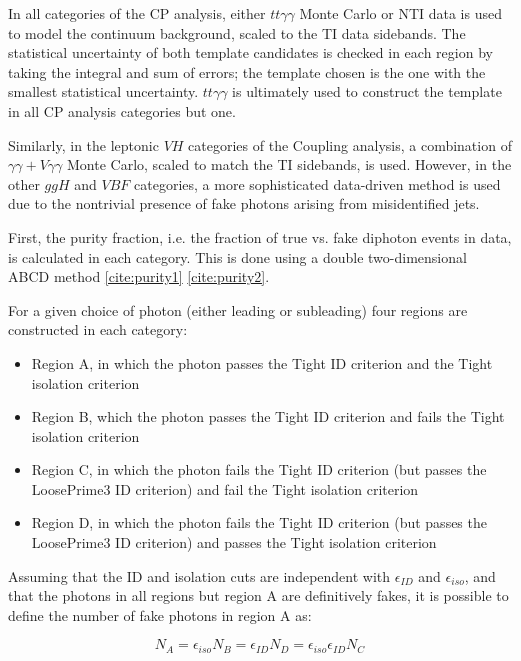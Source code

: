 In all categories of the CP analysis, either $tt\gamma\gamma$ Monte Carlo or NTI data is used to model the continuum background, scaled to the TI data sidebands. The statistical uncertainty of both template candidates is checked in each region by taking the integral and sum of errors; the template chosen is the one with the smallest statistical uncertainty. $tt\gamma\gamma$ is ultimately used to construct the template in all CP analysis categories but one. 

Similarly, in the leptonic $VH$ categories of the Coupling analysis, a combination of $\gamma\gamma + V\gamma\gamma$ Monte Carlo, scaled to match the TI sidebands, is used. However, in the other $ggH$ and $VBF$ categories, a more sophisticated data-driven method is used due to the nontrivial presence of fake photons arising from misidentified jets. 

First, the purity fraction, i.e. the fraction of true vs. fake diphoton events in data, is calculated in each category. This is done using a double two-dimensional ABCD method \ref{cite:purity1} \ref{cite:purity2}.

For a given choice of photon (either leading or subleading) four regions are constructed in each category:

\begin{itemize}
\item Region A, in which the photon passes the Tight ID criterion and the Tight isolation criterion
\item Region B, which the photon passes the Tight ID criterion and fails the Tight isolation criterion
\item Region C, in which the photon fails the Tight ID criterion (but passes the LoosePrime3 ID criterion) and fail the Tight isolation criterion
\item Region D, in which the photon fails the Tight ID criterion (but passes the LoosePrime3 ID criterion) and passes the Tight isolation criterion
\end{itemize} 

Assuming that the ID and isolation cuts are independent with $\epsilon_{ID}$ and $\epsilon_{iso}$, and that the photons in all regions but region A are definitively fakes, it is possible to define the number of fake photons in region A as:

\begin{equation}
N_{A} = \epsilon_{iso} N_{B} = \epsilon_{ID} N_{D} = \epsilon_{iso} \epsilon_{ID} N_{C}
\end{equation} 

